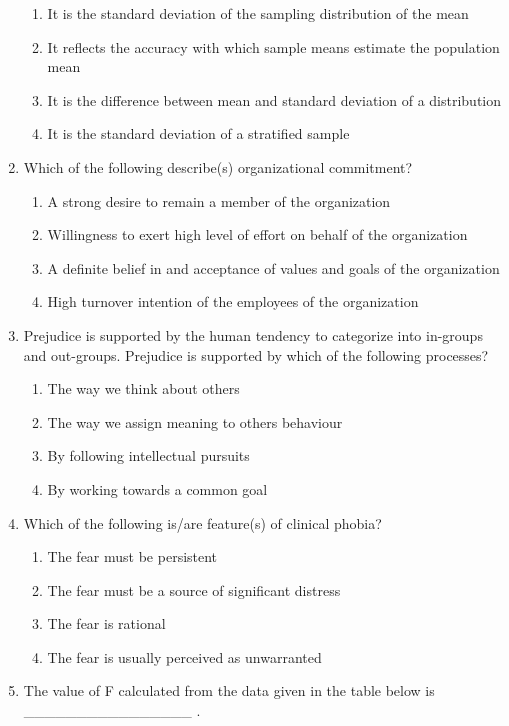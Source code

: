 \documentclass[12pt]{article}
\theoremstyle{remark}
\begin{document}
\begin{enumerate}
\begin{enumerate}
    \item It is the standard deviation of the sampling distribution of the mean
    \item It reflects the accuracy with which sample means estimate the population mean
    \item It is the difference between mean and standard deviation of a distribution 
    \item It is the standard deviation of a stratified sample
\end{enumerate}
\hfill{}
\item Which of the following describe(s) organizational commitment?
\begin{enumerate}
    \item A strong desire to remain a member of the organization
    \item Willingness to exert high level of effort on behalf of the organization
    \item A definite belief in and acceptance of values and goals of the organization
    \item High turnover intention of the employees of the organization 
\end{enumerate}
\hfill{}
\item Prejudice is supported by the human tendency to categorize into in-groups and out-groups. Prejudice is supported by which of the following processes?
\begin{enumerate}
    \item The way we think about others
    \item The way we assign meaning to others behaviour
    \item By following intellectual pursuits
    \item By working towards a common goal
\end{enumerate}
\hfill{}
\item Which of the following is/are feature(s) of clinical phobia?
\begin{enumerate}
    \item The fear must be persistent
    \item The fear must be a source of significant distress
    \item The fear is rational
    \item The fear is usually perceived as unwarranted
\end{enumerate}
\hfill{}
\item The value of F calculated from the data given in the table below is \_\_\_\_\_\_\_\_\_\_\_\_\_\_\_\_ .
\begin{table}[H]
    \centering
     
    \caption{}
    \label{table:5.7}
\end{table}
\hfill{}

\end{enumerate}
\end{document}
